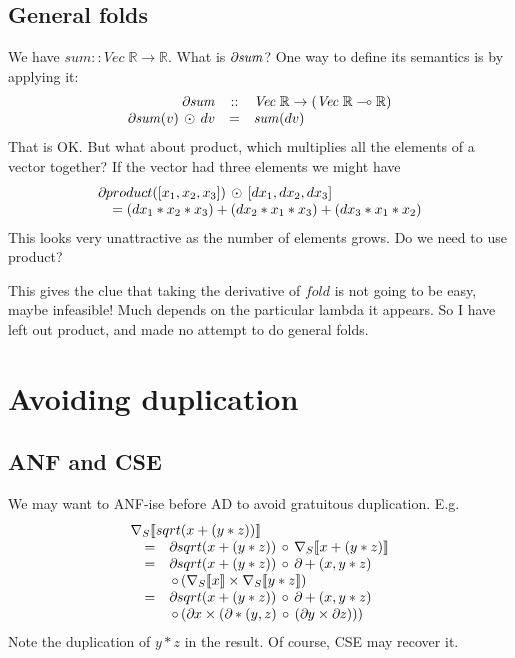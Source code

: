 \documentclass[sigplan,review]{acmart}
\newcommand{\deriv}{\partial}  %
\renewcommand{\to}{\rightarrow}    %
\newcommand{\linto}{\multimap}     %
\newcommand{\grad}[1]{\nabla_S\lb #1 \rb}  %
\newcommand{\gradf}[1]{\deriv\hspace{-0.15mm} #1}  %
\newcommand{\lb}{\llbracket}
\newcommand{\rb}{\rrbracket}
\newcommand{\sumfunname}{\mathit{sum}}   %
\newcommand{\sumfun}[1]{\sumfunname(#1)}   %
\renewcommand{\vector}[1]{\mathit{Vec}\;#1}   %
\newcommand{\real}{\mathbb{R}}       %
\newcommand{\lmcomp}{\,\circ\,}   %
\newcommand{\lmvcat}{\times}         %
\newcommand{\lmapply}{\,\odot\,}      %
\begin{document}
\subsection{General folds} \label{sec:gen-fold}

We have $\sumfunname :: \vector{\real} \to \real$.  What is $\gradf{\sumfunname}$?
One way to define its semantics is by applying it:
$$
\begin{array}{rcl}
  \gradf{\sumfunname} & :: & \vector{\real} \to (\vector{\real} \linto \real) \\
  \gradf{\sumfunname}(v) \lmapply dv & = & \sumfun{dv}
\end{array}
$$
That is OK.  But what about product, which multiplies all the elements
of a vector together? If the vector had three elements we might have
$$
\begin{array}{l}
  \gradf{product}([x_1,x_2,x_3]) \lmapply [dx_1, dx_2, dx_3] \\
  \quad = (dx_1 * x_2 * x_3) + (dx_2 * x_1 * x_3) + (dx_3 * x_1 * x_2)
\end{array}
$$
This looks very unattractive as the number of elements grows.  Do we need
to use product?

This gives the clue that taking the derivative of $\mathit{fold}$ is
not going to be easy, maybe infeasible!  Much depends on the
particular lambda it appears.  So I have left out product, and made
no attempt to do general folds.


\section{Avoiding duplication}

\subsection{ANF and CSE}

We may want to ANF-ise before AD to avoid gratuitous duplication.
  E.g.
$$
  \begin{array}{rcl}
    \multicolumn{3}{l}{\grad{sqrt(x+(y*z))}} \\
      & = & \gradf{sqrt}(x+(y*z)) \lmcomp \grad{x+(y*z)} \\
    & = & \gradf{sqrt}(x+(y*z)) \lmcomp  \gradf{+}(x, y*z) \\
     && \lmcomp (\grad{x} \lmvcat \grad{y*z}) \\
    & = & \gradf{sqrt}(x+(y*z)) \lmcomp \gradf{+}(x, y*z) \\
    & & \lmcomp (\gradf{x} \lmvcat (\gradf{*}(y,z) \lmcomp (\gradf{y} \lmvcat \gradf{z}))) \\
  \end{array}
  $$
Note the duplication of $y*z$ in the result.
Of course, CSE may recover it.
\end{document}
